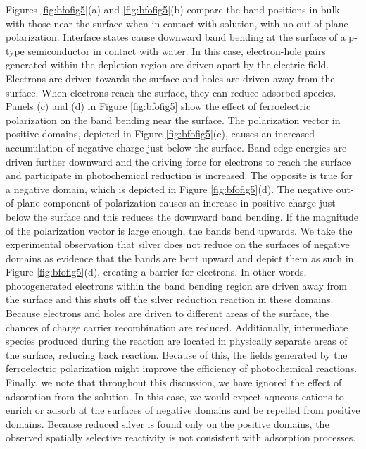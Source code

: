 Figures \ref{fig:bfofig5}(a) and \ref{fig:bfofig5}(b) compare the band positions in bulk  with those near the surface when in contact with solution, with no out-of-plane polarization. Interface states cause downward band bending at the surface of a p-type semiconductor in contact with water.\cite{Morrison:1980va} In this case, electron-hole pairs generated within the depletion region are driven apart by the electric field. Electrons are driven towards the surface and holes are driven away from the surface. When electrons reach the surface, they can reduce adsorbed species. Panels (c) and (d) in Figure \ref{fig:bfofig5} show the effect of ferroelectric polarization on the band bending near the surface. The polarization vector in positive domains, depicted in Figure \ref{fig:bfofig5}(c), causes an increased accumulation of negative charge just below the surface. Band edge energies are driven further downward and the driving force for electrons to reach the surface and participate in photochemical reduction is increased. The opposite is true for a negative domain, which is depicted in Figure \ref{fig:bfofig5}(d). The negative out-of-plane component of polarization causes an increase in positive charge just below the surface and this reduces the downward band bending. If the magnitude of the polarization vector is large enough, the bands bend upwards. We take the experimental observation that silver does not reduce on the surfaces of negative domains as evidence that the bands are bent upward and depict them as such in Figure \ref{fig:bfofig5}(d), creating a barrier for electrons. In other words, photogenerated electrons within the band bending region are driven away from the surface and this shuts off the silver reduction reaction in these domains. Because electrons and holes are driven to different areas of the surface, the chances of charge carrier recombination are reduced. Additionally, intermediate species produced during the reaction are located in physically separate areas of the surface, reducing back reaction. Because of this, the fields generated by the ferroelectric polarization might improve the efficiency of photochemical reactions. Finally, we note that throughout this discussion, we have ignored the effect of adsorption from the solution. In this case, we would expect aqueous  cations to enrich or adsorb at the surfaces of negative domains and be repelled from positive domains. Because reduced silver is found only on the positive domains, the observed spatially selective reactivity is not consistent with adsorption processes.


